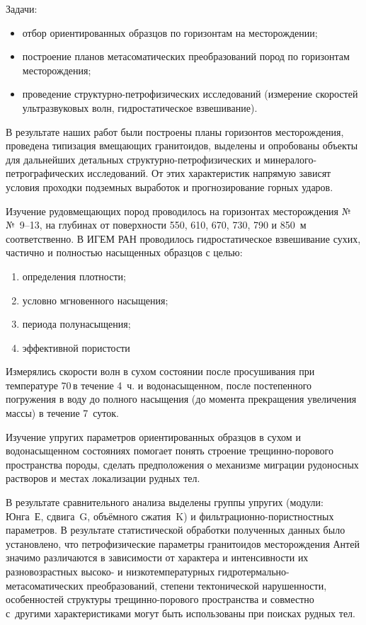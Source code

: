 Задачи:
\begin{itemize}[noitemsep]\vspace{-8pt}
  \item отбор ориентированных образцов по горизонтам на месторождении;
  \item построение планов метасоматических преобразований пород по горизонтам месторождения;
  \item проведение структурно-петрофизических исследований (измерение скоростей ультразвуковых волн, гидростатическое взвешивание).
\end{itemize}
 \vspace{-8pt}
\clearpage
В результате наших работ были построены планы горизонтов месторождения, проведена типизация вмещающих гранитоидов, выделены и опробованы объекты для дальнейших детальных структурно-петрофизических и минералого-петрографических исследований. От этих характеристик напрямую зависят условия проходки подземных выработок и прогнозирование горных ударов.

Изучение рудовмещающих пород проводилось на горизонтах месторождения №№~9--13, на глубинах от поверхности 550, 610, 670, 730, 790 и 850~м соответственно. В ИГЕМ РАН проводилось гидростатическое взвешивание сухих, частично и полностью насыщенных образцов с целью:
\begin{enumerate}[noitemsep]\vspace{-8pt}
  \item определения плотности;
  \item условно мгновенного насыщения;
  \item периода полунасыщения;
  \item эффективной пористости
\end{enumerate}
 \vspace{-8pt}
Измерялись скорости волн в сухом состоянии после просушивания при температуре 70\,\dgc в течение 4~ч. и водонасыщенном, после постепенного погружения в воду до полного насыщения (до момента прекращения увеличения массы) в течение 7~суток.

Изучение упругих параметров ориентированных образцов в сухом и водонасыщенном состояниях помогает понять строение трещинно-порового пространства породы, сделать предположения о механизме миграции рудоносных растворов и местах локализации рудных тел.

В результате сравнительного анализа выделены группы упругих (модули: Юнга~Е, сдвига~G, объёмного сжатия~K) и фильтрационно-пористностных параметров. В результате статистической обработки полученных данных было установлено, что петрофизические параметры гранитоидов месторождения Антей значимо различаются в зависимости от характера и интенсивности их разновозрастных высоко- и низкотемпературных гидротермально-метасоматических преобразований, степени тектонической нарушенности, особенностей структуры трещинно-порового пространства и совместно с~другими характеристиками могут быть использованы при поисках рудных тел.

